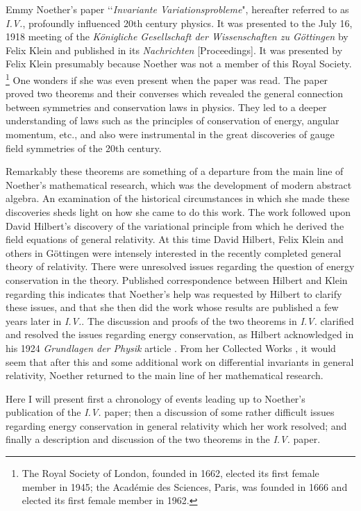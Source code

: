  
Emmy Noether's paper \lq\lq{\it{Invariante Variationsprobleme}}"\cite{noet},
hereafter referred to as {\it{I.V.}}, profoundly influenced 20th century
physics.  It was presented to the July 16, 1918 meeting of the
{\it{K\"{o}nigliche Gesellschaft der Wissenschaften zu G\"{o}ttingen}} by Felix 
Klein and published in its {\it{Nachrichten}} [Proceedings]. It was presented by 
 Felix Klein  presumably because
Noether was not a member of this Royal Society.
{\footnote{The Royal Society of London, founded in 1662, elected its first
female member in 1945; the Acad\'{e}mie des Sciences, Paris, was founded in
1666 and elected its first female member in 1962.}} One wonders if she was even
present when the paper was read.  The paper proved two theorems and their
converses which revealed the general connection between symmetries and
conservation laws in physics.  They led to a deeper understanding of laws such
as the principles of conservation of energy, angular momentum, etc., and also
were instrumental in the great discoveries of gauge field symmetries of the 20th
century.\cite{byers}

Remarkably these theorems are something of a departure from the main line of Noether's
mathematical research, which was the development of modern abstract algebra.  An examination
of the historical circumstances in which she made these discoveries sheds light on how she came to do this work.
  The work  followed upon David Hilbert's discovery
of the variational principle from which he derived
  the field equations of
general relativity.  
At this time 
 David Hilbert, Felix Klein and others in G\"{o}ttingen were intensely  interested in the recently  completed general theory of relativity. There were
unresolved issues regarding the question of energy conservation in the theory.
Published correspondence \cite{klein} 
between Hilbert and Klein regarding this indicates that   Noether's help was requested by Hilbert to clarify these
issues, and that she
then did the work whose results are published a few years later in {\it{I.V.}}. 
The discussion and proofs of  the two theorems  in {\it{I.V.}} clarified and
resolved the issues regarding energy conservation, as Hilbert acknowledged
in his 1924 {\it{Grundlagen der Physik}} article \cite{hilbert1}. From her Collected Works \cite{publist}, it would
seem that after this and some additional work on
differential invariants in general relativity\cite{paper1}, Noether returned to the main line
of her mathematical research.

Here I will present first a chronology of events leading up to Noether's publication of the
{\it{I.V.}} paper;  then a discussion of some rather difficult issues regarding
energy conservation in general relativity which her work resolved; and finally a
description and discussion of the two theorems in the {\it{I.V.}} paper.





